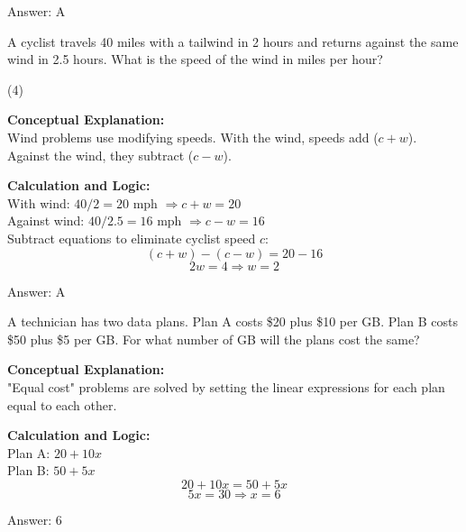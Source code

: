 \documentclass[11pt,paper=a4,answers]{exam}
\begin{document}
\begin{questions}
\begin{solution}
\vspace{15pt}
Answer: \colorbox{yellow!100}{A}
\end{solution}

\question
A cyclist travels 40 miles with a tailwind in 2 hours and returns against the same wind in 2.5 hours. What is the speed of the wind in miles per hour?
\begin{tasks}(4)
\end{tasks}

\begin{solution}
\textbf{Conceptual Explanation:} \\
Wind problems use modifying speeds. With the wind, speeds add ($c + w$). Against the wind, they subtract ($c - w$).

\vspace{10pt}
\textbf{Calculation and Logic:} \\
With wind: $40 / 2 = 20$ mph $\Rightarrow c + w = 20$ \\
Against wind: $40 / 2.5 = 16$ mph $\Rightarrow c - w = 16$ \\
Subtract equations to eliminate cyclist speed $c$:
\[(c + w) - (c - w) = 20 - 16\]
\[2w = 4 \Rightarrow w = 2\]

\vspace{15pt}
Answer: \colorbox{yellow!100}{A}
\end{solution}

\question
A technician has two data plans. Plan A costs \$20 plus \$10 per GB. Plan B costs \$50 plus \$5 per GB. For what number of GB will the plans cost the same?

\begin{solution}
\textbf{Conceptual Explanation:} \\
"Equal cost" problems are solved by setting the linear expressions for each plan equal to each other.

\vspace{10pt}
\textbf{Calculation and Logic:} \\
Plan A: $20 + 10x$ \\
Plan B: $50 + 5x$ \\
\[20 + 10x = 50 + 5x\]
\[5x = 30 \Rightarrow x = 6\]

\vspace{15pt}
Answer: \colorbox{yellow!100}{6}
\end{solution}


\end{questions}
\end{document}
